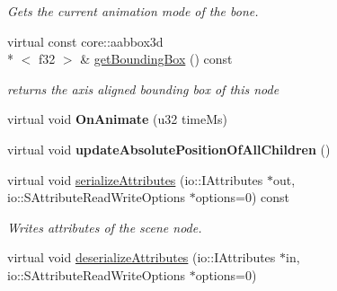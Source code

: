 \begin{DoxyCompactItemize}
\begin{DoxyCompactList}\small\item\em Gets the current animation mode of the bone. \end{DoxyCompactList}\item 
\hypertarget{classirr_1_1scene_1_1_c_bone_scene_node_aa3aaf49f643a1bb2553aa8e60dd00001}{virtual const core\-::aabbox3d\\*
$<$ f32 $>$ \& \hyperlink{classirr_1_1scene_1_1_c_bone_scene_node_aa3aaf49f643a1bb2553aa8e60dd00001}{get\-Bounding\-Box} () const }\label{classirr_1_1scene_1_1_c_bone_scene_node_aa3aaf49f643a1bb2553aa8e60dd00001}

\begin{DoxyCompactList}\small\item\em returns the axis aligned bounding box of this node \end{DoxyCompactList}\item 
\hypertarget{classirr_1_1scene_1_1_c_bone_scene_node_aa73509987c1e7db30be8fe63a18c4897}{virtual void {\bfseries On\-Animate} (u32 time\-Ms)}\label{classirr_1_1scene_1_1_c_bone_scene_node_aa73509987c1e7db30be8fe63a18c4897}

\item 
\hypertarget{classirr_1_1scene_1_1_c_bone_scene_node_ae98693a95ce4c177d147507301a65cec}{virtual void {\bfseries update\-Absolute\-Position\-Of\-All\-Children} ()}\label{classirr_1_1scene_1_1_c_bone_scene_node_ae98693a95ce4c177d147507301a65cec}

\item 
\hypertarget{classirr_1_1scene_1_1_c_bone_scene_node_adb7a9cfb1a498ca55135e5a224e69ce1}{virtual void \hyperlink{classirr_1_1scene_1_1_c_bone_scene_node_adb7a9cfb1a498ca55135e5a224e69ce1}{serialize\-Attributes} (io\-::\-I\-Attributes $\ast$out, io\-::\-S\-Attribute\-Read\-Write\-Options $\ast$options=0) const }\label{classirr_1_1scene_1_1_c_bone_scene_node_adb7a9cfb1a498ca55135e5a224e69ce1}

\begin{DoxyCompactList}\small\item\em Writes attributes of the scene node. \end{DoxyCompactList}\item 
\hypertarget{classirr_1_1scene_1_1_c_bone_scene_node_a5eba7961bde9372db01a92b30bd3bc42}{virtual void \hyperlink{classirr_1_1scene_1_1_c_bone_scene_node_a5eba7961bde9372db01a92b30bd3bc42}{deserialize\-Attributes} (io\-::\-I\-Attributes $\ast$in, io\-::\-S\-Attribute\-Read\-Write\-Options $\ast$options=0)}\label{classirr_1_1scene_1_1_c_bone_scene_node_a5eba7961bde9372db01a92b30bd3bc42}


\end{DoxyCompactItemize}

